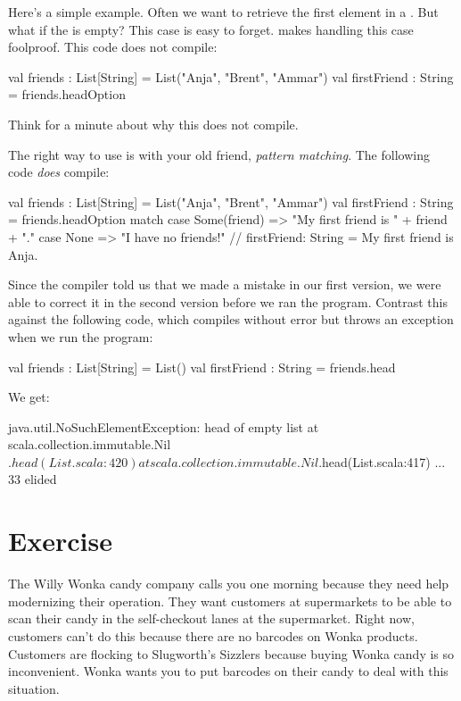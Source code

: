 \documentclass[9pt]{extbook}
\begin{document}
Here's a simple example.  Often we want to retrieve the first element in a .  But what if the  is empty?  This case is easy to forget.   makes handling this case foolproof.  This code does not compile:

\begin{scalacode}
val friends : List[String] = List("Anja", "Brent", "Ammar")
val firstFriend : String = friends.headOption
\end{scalacode}

Think for a minute about why this does not compile.

The right way to use  is with your old friend, \emph{pattern matching}.  The following code \emph{does} compile:

\begin{scalacode}
val friends : List[String] = List("Anja", "Brent", "Ammar")
val firstFriend : String = friends.headOption match {
  case Some(friend) => "My first friend is " + friend + "."
  case None => "I have no friends!"
}
// firstFriend: String = My first friend is Anja.
\end{scalacode}

Since the compiler told us that we made a mistake in our first version, we were able to correct it in the second version before we ran the program.  Contrast this against the following code, which compiles without error but throws an exception when we run the program:

\begin{scalacode}
val friends : List[String] = List()
val firstFriend : String = friends.head
\end{scalacode}

We get:

\begin{scalacode}
java.util.NoSuchElementException: head of empty list
  at scala.collection.immutable.Nil$.head(List.scala:420)
  at scala.collection.immutable.Nil$.head(List.scala:417)
  ... 33 elided
\end{scalacode}

\section{Exercise}

The Willy Wonka candy company calls you one morning because they need help modernizing their operation.  They want customers at supermarkets to be able to scan their candy in the self-checkout lanes at the supermarket.  Right now, customers can't do this because there are no barcodes on Wonka products.  Customers are flocking to Slugworth's Sizzlers because buying Wonka candy is so inconvenient.  Wonka wants you to put barcodes on their candy to deal with this situation.
\end{document}
